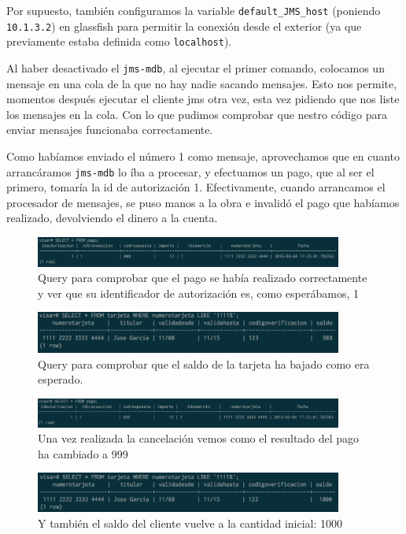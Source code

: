 \documentclass[a4paper, 10pt]{article}
\begin{document}
	Por supuesto, también configuramos la variable \texttt{default\_JMS\_host} (poniendo \texttt{10.1.3.2}) en glassfish para permitir la conexión desde el exterior (ya que previamente estaba definida como \texttt{localhost}).


	Al haber desactivado el \texttt{jms-mdb}, al ejecutar el primer comando, colocamos un mensaje en una cola de la que no hay nadie sacando mensajes. Esto nos permite, momentos después ejecutar el cliente jms otra vez, esta vez pidiendo que nos liste los mensajes en la cola. Con lo que pudimos comprobar que nestro código para enviar mensajes funcionaba correctamente.

	Como habíamos enviado el número 1 como mensaje, aprovechamos que en cuanto arrancáramos \texttt{jms-mdb} lo íba a procesar, y efectuamos un pago, que al ser el primero, tomaría la id de autorización 1. Efectivamente, cuando arrancamos el procesador de mensajes, se puso manos a la obra e invalidó el pago que habíamos realizado, devolviendo el dinero a la cuenta.

	\pagebreak

	\begin{figure}[H]
		\centering
		\includegraphics[width=0.9\textwidth]{pantallazos/ejercicio12a.png}
		\caption{Query para comprobar que el pago se había realizado correctamente y ver que su identificador de autorización es, como esperábamos, 1}
	\end{figure}

	\begin{figure}[htbp]
		\centering
		\includegraphics[width=0.9\textwidth]{pantallazos/ejercicio12b.png}
		\caption{Query para comprobar que el saldo de la tarjeta ha bajado como era esperado.}
	\end{figure}

	\begin{figure}[htbp]
		\centering
		\includegraphics[width=0.9\textwidth]{pantallazos/ejercicio12c.png}
		\caption{Una vez realizada la cancelación vemos como el resultado del pago ha cambiado a 999}
	\end{figure}

	\begin{figure}[htbp]
		\centering
		\includegraphics[width=0.9\textwidth]{pantallazos/ejercicio12d.png}
		\caption{Y también el saldo del cliente vuelve a la cantidad inicial: 1000}
	\end{figure}




\end{document}

